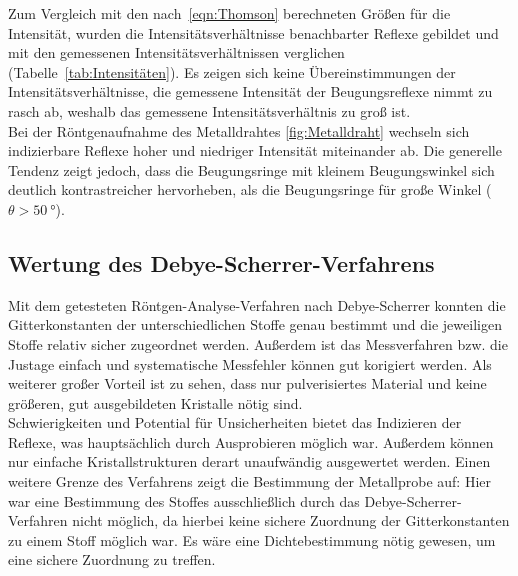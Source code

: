 \documentclass[a4paper,twoside,final]{article}
\begin{document}
Zum Vergleich mit den nach~\eqref{eqn:Thomson} berechneten Größen für die Intensität, wurden die Intensitätsverhältnisse benachbarter Reflexe gebildet und mit den gemessenen Intensitätsverhältnissen verglichen (Tabelle~\ref{tab:Intensitäten}). Es zeigen sich keine Übereinstimmungen der Intensitätsverhältnisse, die gemessene Intensität der Beugungsreflexe nimmt zu rasch ab, weshalb das gemessene Intensitätsverhältnis zu groß ist.\\
Bei der Röntgenaufnahme des Metalldrahtes \ref{fig:Metalldraht} wechseln sich indizierbare Reflexe hoher und niedriger Intensität miteinander ab. Die generelle Tendenz zeigt jedoch, dass die Beugungsringe mit kleinem Beugungswinkel sich deutlich kontrastreicher hervorheben, als die Beugungsringe für große Winkel ($\theta > \SI{50}{\degree}$).

\subsection{Wertung des Debye-Scherrer-Verfahrens}
Mit dem getesteten Röntgen-Analyse-Verfahren nach Debye-Scherrer konnten die Gitterkonstanten der unterschiedlichen Stoffe genau bestimmt und die jeweiligen Stoffe relativ sicher zugeordnet werden. Außerdem ist das Messverfahren bzw. die Justage einfach und systematische Messfehler können gut korigiert werden. Als weiterer großer Vorteil ist zu sehen, dass nur pulverisiertes Material und keine größeren, gut ausgebildeten Kristalle nötig sind.\\
Schwierigkeiten und Potential für Unsicherheiten bietet das Indizieren der Reflexe, was hauptsächlich durch Ausprobieren möglich war. Außerdem können nur einfache Kristallstrukturen derart unaufwändig ausgewertet werden. Einen weitere Grenze des Verfahrens zeigt die Bestimmung der Metallprobe auf: Hier war eine Bestimmung des Stoffes ausschließlich durch das Debye-Scherrer-Verfahren nicht möglich, da hierbei keine sichere Zuordnung der Gitterkonstanten zu einem Stoff möglich war. Es wäre eine Dichtebestimmung nötig gewesen, um eine sichere Zuordnung zu treffen.


\end{document}
